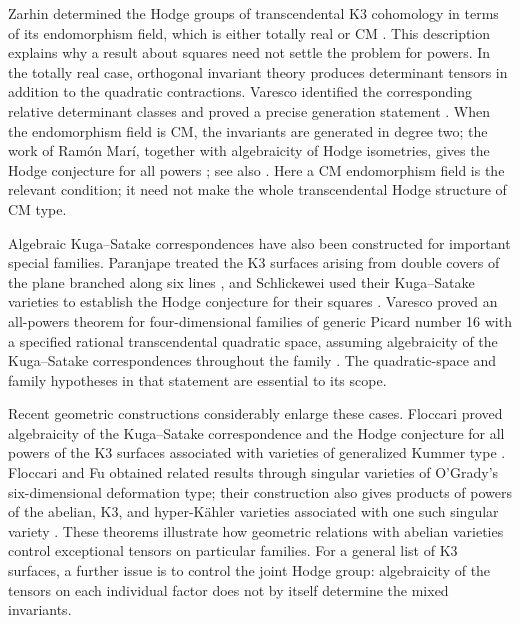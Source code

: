 Zarhin determined the Hodge groups of transcendental K3 cohomology in terms
of its endomorphism field, which is either totally real or CM \cite{Zarhin}.
This description explains why a result about squares need not settle the
problem for powers.  In the totally real case, orthogonal invariant theory
produces determinant tensors in addition to the quadratic contractions.
Varesco identified the corresponding relative determinant classes and
proved a precise generation statement
\cite[Theorem~2.16]{VarescoPowers}.  When the endomorphism field is CM, the
invariants are generated in degree two; the work of Ram\'on Mar\'i, together
with algebraicity of Hodge isometries, gives the Hodge conjecture for all
powers \cite{RamonMari,Buskin}; see also
\cite[Theorem~2.2 and Corollary~2.3]{VarescoPowers}.  Here a CM endomorphism
field is the relevant condition; it need not make the whole transcendental
Hodge structure of CM type.

Algebraic Kuga--Satake correspondences have also been constructed for
important special families.  Paranjape treated the K3 surfaces arising
from double covers of the plane branched along six lines \cite{Paranjape},
and Schlickewei used their Kuga--Satake varieties to establish the Hodge
conjecture for their squares \cite[Theorem~2]{Schlickewei}.  Varesco proved an
all-powers theorem for four-dimensional families of generic Picard number
16 with a specified rational transcendental quadratic space, assuming
algebraicity of the Kuga--Satake correspondences throughout the family
\cite[Theorem~0.2]{VarescoPowers}.  The quadratic-space and family
hypotheses in that statement are essential to its scope.

Recent geometric constructions considerably enlarge these cases.
Floccari proved algebraicity of the Kuga--Satake correspondence and the
Hodge conjecture for all powers of the K3 surfaces associated with varieties
of generalized Kummer type \cite[Theorem~1.2]{FloccariKummer}.
Floccari and Fu obtained related results through singular varieties of
O'Grady's six-dimensional deformation type; their construction also gives
products of powers of the abelian, K3, and hyper-K\"ahler varieties
associated with one such singular variety
\cite[Theorem~5.7 and Corollary~5.8]{FloccariFu}.  These theorems illustrate
how geometric relations with abelian varieties control exceptional tensors
on particular families.  For a general list of K3 surfaces, a further
issue is to control the joint Hodge group: algebraicity of the tensors on
each individual factor does not by itself determine the mixed invariants.

